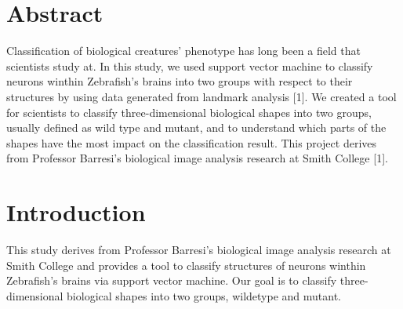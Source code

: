 \documentclass[10pt,letterpaper]{article}
\date{}
\newcommand{\getIndex}[2]{
  \ForEach{,}{\IfEq{#1}{\thislevelitem}{\number\thislevelcount\ExitForEach}{}}{#2}
}
\newcommand{\getAff}[1]{
  \getIndex{#1}{Smith College}
}
\begin{document}
\vspace*{0.2in}

\section*{Abstract}
Classification of biological creatures' phenotype has long been a field
that scientists study at. In this study, we used support vector machine
to classify neurons winthin Zebrafish's brains into two groups with
respect to their structures by using data generated from landmark
analysis {[}1{]}. We created a tool for scientists to classify
three-dimensional biological shapes into two groups, usually defined as
wild type and mutant, and to understand which parts of the shapes have
the most impact on the classification result. This project derives from
Professor Barresi's biological image analysis research at Smith College
{[}1{]}.


\linenumbers

\newpage

\section{Introduction}\label{introduction}

This study derives from Professor Barresi's biological image analysis
research at Smith College and provides a tool to classify structures of
neurons winthin Zebrafish's brains via support vector machine. Our goal
is to classify three-dimensional biological shapes into two groups,
wildetype and mutant.
\end{document}
